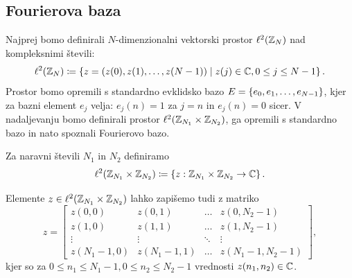 \subsection{Fourierova baza}
%
Najprej bomo definirali $N$-dimenzionalni vektorski prostor $\ell^2(\mathbb Z_N)$ nad kompleksnimi šte\-vi\-li:
$$\ell^2(\mathbb Z_N) \coloneqq \left\{z = (z(0), z(1), \ldots, z(N-1)) \mid z(j) \in \mathbb C, 0 \leq j \leq N-1\right\}.$$
Prostor bomo opremili s standardno evklidsko bazo $E = \left\{e_0, e_1, \ldots, e_{N-1}\right\}$, kjer za bazni element $e_j$ velja: $e_j(n) = 1$ za $j=n$ in $e_j(n) = 0$ sicer. V nadaljevanju bomo definirali prostor $\ell^2(\mathbb Z_{N_1} \times \mathbb Z_{N_2})$, ga opremili s standardno bazo in nato spoznali Fourierovo bazo.
%
\begin{definicija}
  Za naravni števili $N_1$ in $N_2$ definiramo
  $$\ell^2(\mathbb Z_{N_1} \times \mathbb Z_{N_2}) \coloneqq \left\{z : \mathbb Z_{N_1} \times \mathbb Z_{N_2} \to \mathbb C\right\}.$$
\end{definicija}
%
Elemente $z \in \ell^2(\mathbb Z_{N_1} \times \mathbb Z_{N_2})$ lahko zapišemo tudi z matriko
%
\begin{equation*}
  z =
    \begin{bmatrix}
      z(0, 0) & z(0, 1) & \hdots & z(0, N_2-1)\\
      z(1, 0) & z(1, 1) & \hdots & z(1, N_2-1)\\
      \vdots & \vdots & \ddots & \vdots\\
      z(N_1-1, 0) & z(N_1-1, 1) & \hdots & z(N_1-1, N_2-1)
    \end{bmatrix},
\end{equation*}
%
kjer so za $0 \leq n_1 \leq N_1-1, 0 \leq n_2 \leq N_2-1$ vrednosti $z(n_1, n_2) \in \mathbb C$.

